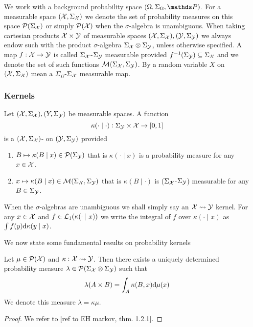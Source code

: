 

We work with a background probability space $(\Omega, \Sigma_\Omega, \Prob)$.
For a measurable space $(\mathcal{X}, \Sigma_{\mathcal{X}})$ we denote
the set of probability measures on this space $\mathcal{P}(\Sigma_\mathcal{X})$ or
simply $\mathcal{P}(\mathcal{X})$ when the $\sigma$-algebra is unambiguous.
When taking cartesian products $\mathcal{X} \times \mathcal{Y}$ of measurable spaces
$(\mathcal{X}, \Sigma_\mathcal{X}), (\mathcal{Y}, \Sigma_\mathcal{Y})$ we always endow such
with the product $\sigma$-algebra $\Sigma_\mathcal{X} \otimes \Sigma_\mathcal{Y}$,
unless otherwise specified.
A map $f: \mathcal{X} \to \mathcal{Y}$ is called $\Sigma_{\mathcal{X}}$-$\Sigma_{\mathcal{Y}}$
measurable provided $f^{-1}(\Sigma_{\mathcal{Y}}) \subseteq \Sigma_{\mathcal{X}}$
and we denote the set of such functions $\mathcal{M}(\Sigma_{\mathcal{X}},
\Sigma_{\mathcal{Y}})$.
By a random variable $X$ on $(\mathcal{X}, \Sigma_{\mathcal{X}})$ mean a
$\Sigma_\Omega$-$\Sigma_{\mathcal{X}}$ measurable map.

\subsubsection{Kernels}

\begin{defn}
  Let $(\mathcal{X}, \Sigma_\mathcal{X}), (Y, \Sigma_\mathcal{Y})$ be measurable spaces.
  A function
  \[ \kappa(\cdot \mid \cdot) : \Sigma_\mathcal{Y} \times \mathcal{X} \to [0,1] \]
  is a $(\mathcal{X}, \Sigma_\mathcal{X})$-
  on $(\mathcal{Y}, \Sigma_\mathcal{Y})$ provided
  \begin{enumerate}
    \item $B \mapsto \kappa(B \mid x) \in \mathcal{P}(\Sigma_\mathcal{Y})$
      that is $\kappa(\cdot \mid x)$ is a probability measure
      for any $x \in \mathcal{X}$.
    \item
      $x \mapsto \kappa(B \mid x) \in \mathcal{M}(\Sigma_\mathcal{X}, \Sigma_\mathcal{Y})$
      that is $\kappa(B \mid \cdot)$ is ($\Sigma_\mathcal{X}$-$\Sigma_\mathcal{Y}$)
      measurable for any $B \in \Sigma_\mathcal{Y}$.
  \end{enumerate}
  When the $\sigma$-algebras are unambiguous we shall simply say an
  $\mathcal{X} \leadsto \mathcal{Y}$ kernel.
  For any $x \in \mathcal{X}$ and $f \in \mathcal{L}_1(\kappa(\cdot \mid x))$
  we write the integral of $f$ over $\kappa(\cdot \mid x)$ as
  $\int f(y) \mathrm{d} \kappa(y \mid x)$.
  \label{defn:probKer}
\end{defn}

We now state some fundamental results on probability kernels
\begin{thm}
  Let $\mu \in \mathcal{P}(\mathcal{X})$ and $\kappa : \mathcal{X} \leadsto \mathcal{Y}$.
  Then there exists a uniquely determined probability measure
  $\lambda \in \mathcal{P}(\Sigma_\mathcal{X} \otimes \Sigma_\mathcal{Y})$
  such that
  \[ \lambda(A \times B) = \int_A \kappa(B, x) \mathrm{d} \mu(x) \]
  \label{thm:intKer}
  We denote this measure $\lambda = \kappa \mu$.
\end{thm}
\begin{proof}
  We refer to [ref to EH markov, thm. 1.2.1].
\end{proof}

